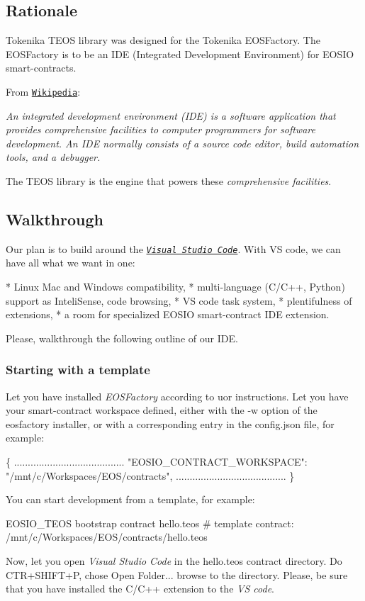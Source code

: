 \subsection*{Rationale}

Tokenika T\+E\+OS library was designed for the Tokenika E\+O\+S\+Factory. The E\+O\+S\+Factory is to be an I\+DE (Integrated Development Environment) for E\+O\+S\+IO smart-\/contracts.

From \href{#https://en.wikipedia.org/wiki/Integrated_development_environment}{\tt Wikipedia}\+:

{\itshape An integrated development environment (I\+DE) is a software application that provides comprehensive facilities to computer programmers for software development. An I\+DE normally consists of a source code editor, build automation tools, and a debugger.}

The T\+E\+OS library is the engine that powers these {\itshape comprehensive facilities}.

\subsection*{Walkthrough}

Our plan is to build around the \href{#https://code.visualstudio.com/}{\tt {\itshape Visual Studio Code}}. With VS code, we can have all what we want in one\+: \begin{DoxyVerb}* Linux Mac and Windows compatibility,
* multi-language (C/C++, Python) support as InteliSense, code browsing,
* VS code task system,
* plentifulness of extensions,
* a room for specialized EOSIO smart-contract IDE extension.
\end{DoxyVerb}


Please, walkthrough the following outline of our I\+DE.

\subsubsection*{Starting with a template}

Let you have installed {\itshape E\+O\+S\+Factory} according to uor instructions. Let you have your smart-\/contract workspace defined, either with the {\ttfamily -\/w} option of the {\ttfamily eosfactory} installer, or with a corresponding entry in the {\ttfamily config.\+json} file, for example\+: 
\begin{DoxyCode}
\{
........................................
    "EOSIO\_CONTRACT\_WORKSPACE": "/mnt/c/Workspaces/EOS/contracts", 
........................................
\}
\end{DoxyCode}
 You can start development from a template, for example\+: 
\begin{DoxyCode}
$ $EOSIO\_TEOS bootstrap contract hello.teos
#  template contract: /mnt/c/Workspaces/EOS/contracts/hello.teos
\end{DoxyCode}
 Now, let you open {\itshape Visual Studio Code} in the {\ttfamily hello.\+teos} contract directory. Do {\ttfamily C\+T\+R+\+S\+H\+I\+F\+T+P}, chose {\ttfamily Open Folder...} browse to the directory. Please, be sure that you have installed the {\ttfamily C/\+C++} extension to the {\itshape VS code}.

